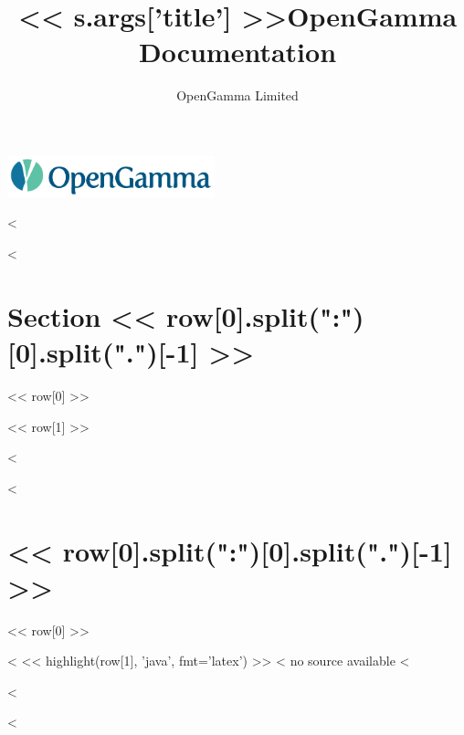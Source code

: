 \documentclass[a4paper]{amsbook}
\title{<< s.args['title'] >>}
\title{OpenGamma Documentation}
\author{OpenGamma Limited}
\begin{document}
\maketitle%

\begin{center}
\includegraphics[width=6cm]{../shared/OpenGammaLogo.jpg}
\hspace{1cm}
\end{center}


<%

<%
\newpage
\section{Section << row[0].split(":")[0].split(".")[-1] >>}

\vspace{1cm}

<< row[0] >>

\vspace{1cm}

<< row[1] >>

\vspace{1cm}

<%

<%
\section{<< row[0].split(":")[0].split(".")[-1] >>}

\vspace{1cm}

<< row[0] >>

\vspace{1cm}

<%
<< highlight(row[1], 'java', fmt='latex') >>
<%
no source available
<%

\vspace{1cm}

<%

<%
\end{document}
